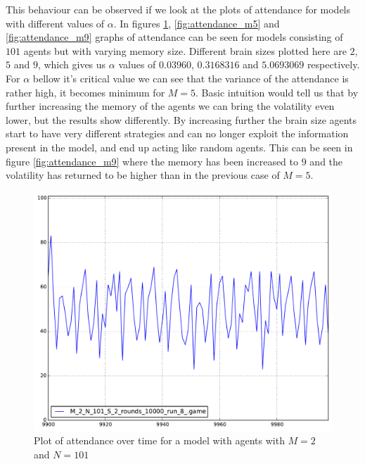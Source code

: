 This behaviour can be observed if we look at the plots of attendance for models with different values of $\alpha$. In figures \ref{fig:attendance_m2}, \ref{fig:attendance_m5} and \ref{fig:attendance_m9} graphs of attendance can be seen for models consisting of $101$ agents but with varying memory size. Different brain sizes plotted here are $2$, $5$ and $9$, which gives us $\alpha$ values of $0.03960$, $0.3168316$ and $5.0693069$ respectively. For $\alpha$ bellow it's critical value we can see that the variance of the attendance is rather high, it becomes minimum for $M=5$.
Basic intuition would tell us that by further increasing the memory of the agents we can bring the volatility even lower, but the results show differently.
By increasing further the brain size agents start to have very different strategies and can no longer exploit the information present in the model, and end up acting like random agents. 
This can be seen in figure \ref{fig:attendance_m9} where the memory has been increased to $9$ and the volatility has returned to be higher than in the previous case of $M=5$.

\begin{figure}[h]
\begin{center}
\includegraphics[scale=0.4]{images/minority/attendance_m2_n101.pdf}
\caption{Plot of attendance over time for a model with agents with $M=2$ and $N=101$}
\label{fig:attendance_m2}
\end{center}
\end{figure}

